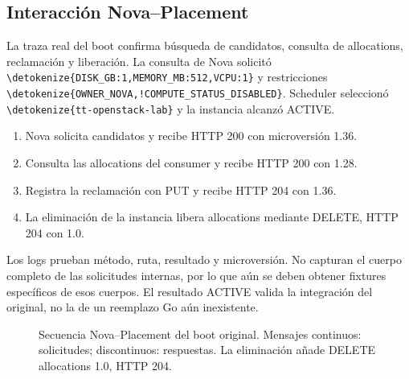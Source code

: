 \documentclass[12pt,a4paper]{article}
\newcommand{\code}[1]{{\small\expandafter\nolinkurl\expandafter{\detokenize{#1}}}}
\begin{document}
\subsection{Interacción Nova--Placement}
La traza real del boot confirma búsqueda de candidatos, consulta de allocations, reclamación y liberación. La consulta de Nova solicitó \code{DISK_GB:1,MEMORY_MB:512,VCPU:1} y restricciones \code{OWNER_NOVA,!COMPUTE_STATUS_DISABLED}. Scheduler seleccionó \code{tt-openstack-lab} y la instancia alcanzó ACTIVE.
\begin{enumerate}
\item Nova solicita candidatos y recibe HTTP 200 con microversión 1.36.
\item Consulta las allocations del consumer y recibe HTTP 200 con 1.28.
\item Registra la reclamación con PUT y recibe HTTP 204 con 1.36.
\item La eliminación de la instancia libera allocations mediante DELETE, HTTP 204 con 1.0.
\end{enumerate}
Los logs prueban método, ruta, resultado y microversión. No capturan el cuerpo completo de las solicitudes internas, por lo que aún se deben obtener fixtures específicos de esos cuerpos. El resultado ACTIVE valida la integración del original, no la de un reemplazo Go aún inexistente.


\Needspace{310pt}
\begin{figure}[!ht]
\centering
{}
\caption{Secuencia Nova--Placement del boot original. Mensajes continuos: solicitudes; discontinuos: respuestas. La eliminación añade DELETE allocations 1.0, HTTP 204.}
\label{fig:sequence}
\end{figure}
\FloatBarrier
\end{document}
